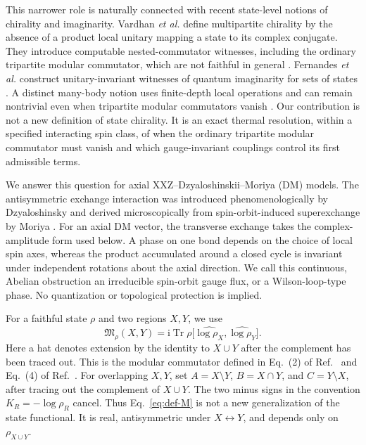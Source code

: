 \documentclass[aps,prb,preprint,nofootinbib,longbibliography]{revtex4-2}
\newcommand{\Tr}{\operatorname{Tr}}
\newcommand{\Mmod}{\mathfrak{M}}
\newcommand{\ii}{\mathrm{i}}
\begin{document}
This narrower role is naturally connected with recent state-level notions of
chirality and imaginarity.  Vardhan \textit{et al.} define multipartite
chirality by the absence of a product local unitary mapping a state to its
complex conjugate.  They introduce computable nested-commutator witnesses,
including the ordinary tripartite modular commutator, which are not faithful
in general \cite{VardhanEtAl2026}.  Fernandes \textit{et al.} construct
unitary-invariant witnesses of quantum imaginarity for sets of states
\cite{FernandesEtAl2024}.  A distinct many-body notion uses finite-depth
local operations and can remain nontrivial even when tripartite modular
commutators vanish \cite{EllisonEtAl2026}.  Our contribution is not a new
definition of state chirality.  It is an exact thermal resolution, within a
specified interacting spin class, of when the ordinary tripartite modular
commutator must vanish and which gauge-invariant couplings control its first
admissible terms.

We answer this question for axial XXZ--Dzyaloshinskii--Moriya (DM) models.
The antisymmetric exchange interaction was introduced phenomenologically by
Dzyaloshinsky and derived microscopically from spin-orbit-induced
superexchange by Moriya \cite{Dzyaloshinsky1958,Moriya1960}.  For an axial DM
vector, the transverse exchange takes the complex-amplitude form used below.
A phase on one bond depends on the
choice of local spin axes, whereas the product accumulated around a closed
cycle is invariant under independent rotations about the axial direction.
We call this continuous, Abelian obstruction an irreducible spin-orbit gauge
flux, or a Wilson-loop-type phase.  No quantization or topological protection
is implied.

For a faithful state $\rho$ and two regions $X,Y$, we use
\begin{equation}
 \Mmod_\rho(X,Y)
 =\ii\Tr\rho
 \bigl[\widehat{\log\rho_X},\widehat{\log\rho_Y}\bigr].
 \label{eq:def-M}
\end{equation}
Here a hat denotes extension by the identity to $X\cup Y$ after the
complement has been traced out.
This is the modular commutator defined in Eq.~(2) of
Ref.~\cite{KimEtAl2022PRL} and Eq.~(4) of
Ref.~\cite{KimEtAl2022PRB}.  For overlapping $X,Y$, set
$A=X\setminus Y$, $B=X\cap Y$, and $C=Y\setminus X$, after tracing out the
complement of $X\cup Y$.  The two minus signs in the convention
$K_R=-\log\rho_R$ cancel.  Thus Eq.~\eqref{eq:def-M} is not a new
generalization of the state functional.  It is real, antisymmetric under
$X\leftrightarrow Y$, and depends only on $\rho_{X\cup Y}$.
\end{document}
